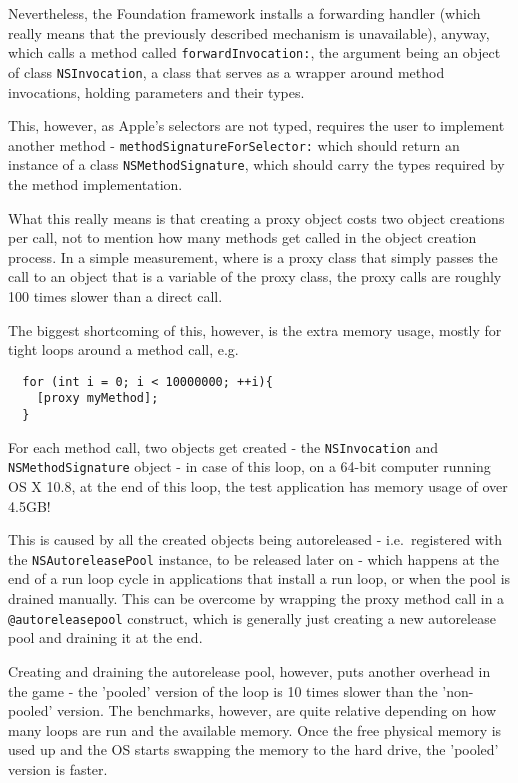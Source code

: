 Nevertheless, the Foundation framework installs a forwarding handler (which really means that the previously described mechanism is unavailable), anyway, which calls a method called \verb=forwardInvocation:=, the argument being an object of class \verb=NSInvocation=, a class that serves as a wrapper around method invocations, holding parameters and their types.

This, however, as Apple's selectors are not typed, requires the user to implement another method - \verb=methodSignatureForSelector:= which should return an instance of a class \verb=NSMethodSignature=, which should carry the types required by the method implementation.

What this really means is that creating a proxy object costs two object creations per call, not to mention how many methods get called in the object creation process. In a simple measurement, where is a proxy class that simply passes the call to an object that is a variable of the proxy class, the proxy calls are roughly 100 times slower than a direct call.

The biggest shortcoming of this, however, is the extra memory usage, mostly for tight loops around a method call, e.g.

\begin{verbatim}
  for (int i = 0; i < 10000000; ++i){
    [proxy myMethod];
  }
\end{verbatim}

For each method call, two objects get created - the \verb=NSInvocation= \newline{}and \verb=NSMethodSignature= object - in case of this loop, on a 64-bit computer running OS X 10.8, at the end of this loop, the test application has memory usage of over 4.5GB!

This is caused by all the created objects being autoreleased - i.e.\ registered with the \verb=NSAutoreleasePool= instance, to be released later on - which happens at the end of a run loop cycle in applications that install a run loop, or when the pool is drained manually. This can be overcome by wrapping the proxy method call in a \verb=@autoreleasepool= construct, which is generally just creating a new autorelease pool and draining it at the end.

Creating and draining the autorelease pool, however, puts another overhead in the game - the 'pooled' version of the loop is 10 times slower than the 'non-pooled' version. The benchmarks, however, are quite relative depending on how many loops are run and the available memory. Once the free physical memory is used up and the OS starts swapping the memory to the hard drive, the 'pooled' version is faster.

